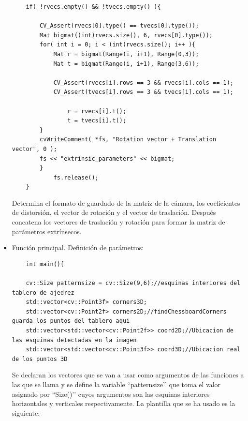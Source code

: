 \begin{itemize}
\begin{verbatim}
    if( !rvecs.empty() && !tvecs.empty() ){
    
    	CV_Assert(rvecs[0].type() == tvecs[0].type());
    	Mat bigmat((int)rvecs.size(), 6, rvecs[0].type());
    	for( int i = 0; i < (int)rvecs.size(); i++ ){
    		Mat r = bigmat(Range(i, i+1), Range(0,3));
    		Mat t = bigmat(Range(i, i+1), Range(3,6));
    
    		CV_Assert(rvecs[i].rows == 3 && rvecs[i].cols == 1);
    		CV_Assert(tvecs[i].rows == 3 && tvecs[i].cols == 1);
          
    			r = rvecs[i].t();
    			t = tvecs[i].t();
        }
        cvWriteComment( *fs, "Rotation vector + Translation vector", 0 );
        fs << "extrinsic_parameters" << bigmat;
        }
    		fs.release();
    }
    \end{verbatim} 
    
Determina el formato de guardado de la matriz de la cámara, los coeficientes de distorsión, el vector de rotación y el vector de traslación. Después concatena los vectores de traslación y rotación para formar la matriz de parámetros extrínsecos.
    
    \item Función principal. Definición de parámetros: \\

    \begin{verbatim} 
    int main(){
    
    cv::Size patternsize = cv::Size(9,6);//esquinas interiores del tablero de ajedrez
    std::vector<cv::Point3f> corners3D;
    std::vector<cv::Point2f> corners2D;//findChessboardCorners guarda los puntos del tablero aqui
    std::vector<std::vector<cv::Point2f>> coord2D;//Ubicacion de las esquinas detectadas en la imagen
    std::vector<std::vector<cv::Point3f>> coord3D;//Ubicacion real de los puntos 3D
    \end{verbatim} 

Se declaran los vectores que se van a usar como argumentos de las funciones a las que se llama y se define la variable ``patternsize’’ que toma el valor asignado por ``Size()’’ cuyos argumentos son las esquinas interiores horizontales y verticales respectivamente. 
La plantilla que se ha usado es la siguiente:


\end{itemize}
